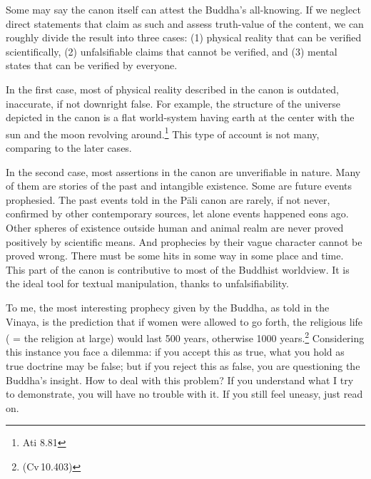 Some may say the canon itself can attest the Buddha's all-knowing. If we neglect direct statements that claim as such and assess truth-value of the content, we can roughly divide the result into three cases: (1) physical reality that can be verified scientifically, (2) unfalsifiable claims that cannot be verified, and (3) mental states that can be verified by everyone.

In the first case, most of physical reality described in the canon is outdated, inaccurate, if not downright false. For example, the structure of the universe depicted in the canon is a flat world-system having earth at the center with the sun and the moon revolving around.\footnote{Ati 8.81} This type of account is not many, comparing to the later cases.

In the second case, most assertions in the canon are unverifiable in nature. Many of them are stories of the past and intangible existence. Some are future events prophesied. The past events told in the P\=ali canon are rarely, if not never, confirmed by other contemporary sources, let alone events happened eons ago. Other spheres of existence outside human and animal realm are never proved positively by scientific means. And prophecies by their vague character cannot be proved wrong. There must be some hits in some way in some place and time. This part of the canon is contributive to most of the Buddhist worldview. It is the ideal tool for textual manipulation, thanks to unfalsifiability.

To me, the most interesting prophecy given by the Buddha, as told in the Vinaya, is the prediction that if women were allowed to go forth, the religious life ( = the religion at large) would last 500 years, otherwise 1000 years.\footnote{ (Cv\,10.403)} Considering this instance you face a dilemma: if you accept this as true, what you hold as true doctrine may be false; but if you reject this as false, you are questioning the Buddha's insight. How to deal with this problem? If you understand what I try to demonstrate, you will have no trouble with it. If you still feel uneasy, just read on.

